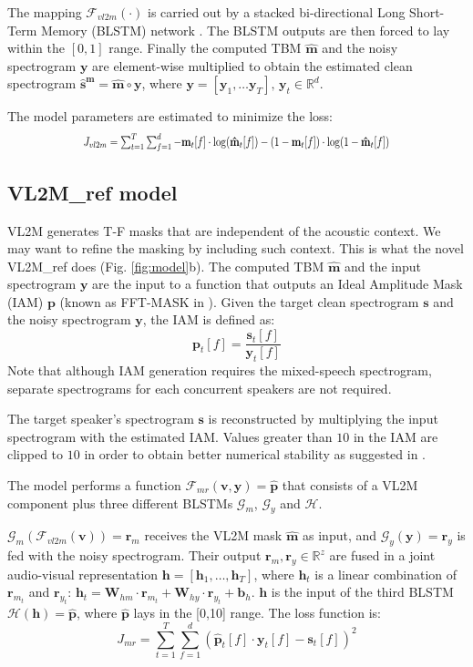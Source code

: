 \documentclass{article}
\begin{document}
The mapping $\mathcal{F}_{vl2m}(\cdot)$ is carried out by a stacked bi-directional Long Short-Term Memory (BLSTM) network \cite{graves13}.
The BLSTM outputs are then forced to lay within the $[0,1]$ range. Finally the computed TBM $\mathbf{\hat{m}}$ and the noisy spectrogram $\mathbf{y}$ are element-wise multiplied to obtain the estimated clean spectrogram $\mathbf{\hat{s}^m} = \mathbf{\hat{m}} \circ \mathbf{y}$, where $\textbf{y}=[\textbf{y}_1, \dots \textbf{y}_T], \, \textbf{y}_t \in \mathbb{R}^d$.

The model parameters are estimated to minimize the loss:
\begin{equation}
    \scalebox{0.78}[1]{$J_{vl2m} = \sum_{t=1}^T \sum_{f=1}^d -\mathbf{m}_t[f] \cdot \log(\mathbf{\hat{m}}_t[f]) - (1-\mathbf{m}_t[f]) \cdot \log(1-\mathbf{\hat{m}}_t[f])$} \nonumber
\end{equation}

\subsection{VL2M\_ref model}
\label{ssec:full_model}
VL2M generates T-F masks that are independent of the acoustic context. We may want to refine the masking by including such context.
This is what the novel VL2M\_ref does (Fig. \ref{fig:model}b). The computed TBM $\mathbf{\hat{m}}$ and the input spectrogram $\mathbf{y}$ are the input to a function that outputs an Ideal Amplitude Mask (IAM) $\mathbf{p}$ (known as FFT-MASK in \cite{yuxuan_wang_training_2014}). Given the target clean spectrogram $\mathbf{s}$ and the noisy spectrogram $\mathbf{y}$, the IAM is defined as:
\[ \mathbf{p}_t[f] = \frac{\mathbf{s}_t[f]}{\mathbf{y}_t[f]} \]
Note that although IAM generation requires the mixed-speech spectrogram, separate spectrograms for each concurrent speakers are not required.

The target speaker's  spectrogram $\mathbf{s}$ is reconstructed by multiplying the input spectrogram with the estimated IAM. Values greater than $10$ in the IAM are clipped to $10$ in order to obtain better numerical stability as suggested in \cite{yuxuan_wang_training_2014}. 

The model performs a function $\mathcal{F}_{mr}(\textbf{v},\textbf{y}) =  \mathbf{\hat{p}}$ that consists of a VL2M component plus three different BLSTMs $\mathcal{G}_m$, $\mathcal{G}_y$ and $\mathcal{H}$. 

$\mathcal{G}_m(\mathcal{F}_{vl2m}(\textbf{v})) =  \textbf{r}_m$ receives the VL2M mask ${\mathbf{\hat{m}}}$ as input, and $\mathcal{G}_y(\textbf{y}) = \textbf{r}_y$ is fed with the noisy spectrogram.
Their output $\textbf{r}_m, \textbf{r}_y \in \mathbb{R}^z$ are fused in a joint audio-visual representation 
$\mathbf{h}=[\textbf{h}_1, \dots , \textbf{h}_T]$, where $\textbf{h}_t$ is a linear combination of $\textbf{r}_{m_t}$ and $\textbf{r}_{y_t}$: $\mathbf{h}_t = \textbf{W}_{hm} \cdot \textbf{r}_{m_t} + \textbf{W}_{hy} \cdot \textbf{r}_{y_t} + \textbf{b}_h$.
$\mathbf{h}$ is the input of the third BLSTM $\mathcal{H}(\mathbf{h})=\mathbf{\hat{p}}$, where $\mathbf{\hat{p}}$ lays in the [0,10] range.
The loss function is:
\[ J_{mr} =  \sum_{t=1}^T \sum_{f=1}^d (\mathbf{\hat{p}}_t[f] \cdot \mathbf{y}_t[f] -  \mathbf{s}_t[f])^2\]
\end{document}

